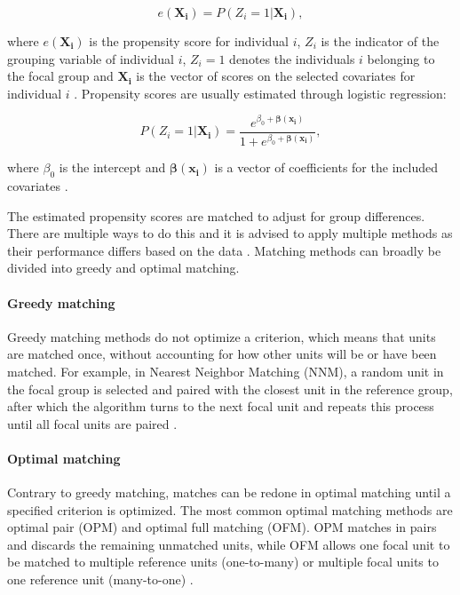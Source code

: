 \documentclass{article}
\begin{document}
\begin{equation} \label{eq:ps}
    e(\mathbf{X_i}) = P(Z_i = 1 | \mathbf{X_i}),
\end{equation}

where $e(\mathbf{X_i})$ is the propensity score for individual $i$, $Z_i$ is the indicator of the grouping variable of individual $i$, $Z_i = 1$ denotes the individuals $i$ belonging to the focal group and $\mathbf{X_i}$ is the vector of scores on the selected covariates for individual $i$ \citep{rosenbaum1983central}. Propensity scores are usually estimated through logistic regression:

\begin{equation} \label{eq:logreg}
    P(Z_i = 1 | \mathbf{X_i}) = \frac{e^{\beta_0 + \mathbf{\beta(x_i)}}}{1 + e^{\beta_0 + \mathbf{\beta(x_i)}}}, 
\end{equation}

where $\beta_0$ is the intercept and $\mathbf{\beta(x_i)}$ is a vector of coefficients for the included covariates \citep{rosenbaum1983central}. 

The estimated propensity scores are matched to adjust for group differences. There are multiple ways to do this and it is advised to apply multiple methods as their performance differs based on the data \citep{liu2016investigating}. Matching methods can broadly be divided into greedy and optimal matching. 

\paragraph{Greedy matching} Greedy matching methods do not optimize a criterion, which means that units are matched once, without accounting for how other units will be or have been matched. For example, in Nearest Neighbor Matching (NNM), a random unit in the focal group is selected and paired with the closest unit in the reference group, after which the algorithm turns to the next focal unit and repeats this process until all focal units are paired \citep{stuart2010matching, liu2016investigating}. 

\paragraph{Optimal matching} Contrary to greedy matching, matches can be redone in optimal matching until a specified criterion is optimized. The most common optimal matching methods are optimal pair (OPM) and optimal full matching (OFM). OPM matches in pairs and discards the remaining unmatched units, while OFM allows one focal unit to be matched to multiple reference units (one-to-many) or multiple focal units to one reference unit (many-to-one) \citep{stuart2010matching, liu2016investigating}. 
\end{document}
